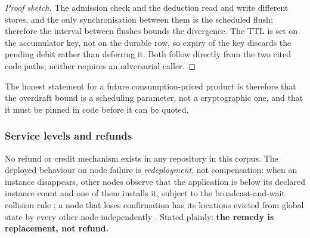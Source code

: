 \begin{proof}[Proof sketch]
The admission check and the deduction read and write different stores, and the only synchronisation
between them is the scheduled flush; therefore the interval between flushes bounds the divergence.
The TTL is set on the accumulator key, not on the durable row, so expiry of the key discards the
pending debit rather than deferring it. Both follow directly from the two cited code paths; neither
requires an adversarial caller.
\end{proof}

The honest statement for a future consumption-priced product is therefore that the overdraft bound is
a scheduling parameter, not a cryptographic one, and that it must be pinned in code before it can be
quoted.

\subsubsection{Service levels and refunds}

No refund or credit mechanism exists in any repository in this corpus. The deployed behaviour on node
failure is \emph{redeployment}, not compensation: when an instance disappears, other nodes observe
that the application is below its declared instance count and one of them installs it, subject to the
broadcast-and-wait collision rule
; a node that loses
confirmation has its locations evicted from global state by every other node independently
. Stated plainly:
\textbf{the remedy is replacement, not refund.}

